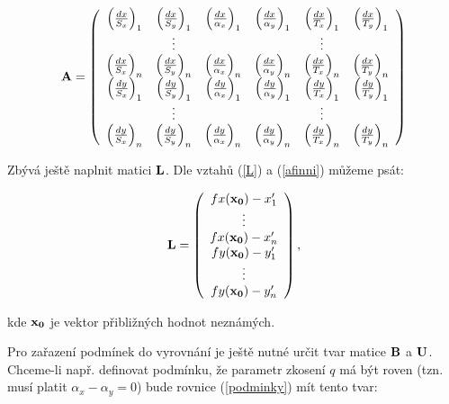\begin{eqnarray}\label{afine2A}
 {\bf A}= \left(
\begin{array}{cccccc}
 \left(\frac{dx}{S_x}\right)_1  &  \left(\frac{dx}{S_y}\right)_1 &
 \left(\frac{dx}{\alpha_{x}}\right)_1    & \left(\frac{dx}{\alpha_{y}}\right)_1 &  
 \left(\frac{dx}{T_x}\right)_1  &  \left(\frac{dx}{T_y}\right)_1 \\
 &\vdots& & &\vdots& \\ 
  \left(\frac{dx}{S_x}\right)_n &  \left(\frac{dx}{S_y}\right)_n &
 \left(\frac{dx}{\alpha_{x}}\right)_n    & \left(\frac{dx}{\alpha_{y}}\right)_n &  
 \left(\frac{dx}{T_x}\right)_n  &  \left(\frac{dx}{T_y}\right)_n \\ 
   \left(\frac{dy}{S_x}\right)_1 &  \left(\frac{dy}{S_y}\right)_1 &
 \left(\frac{dy}{\alpha_{x}}\right)_1    & \left(\frac{dy}{\alpha_{y}}\right)_1 &  
 \left(\frac{dy}{T_x}\right)_1  &  \left(\frac{dy}{T_y}\right)_1 \\
  &\vdots& & &\vdots& \\
  \left(\frac{dy}{S_x}\right)_n &  \left(\frac{dy}{S_y}\right)_n &
 \left(\frac{dy}{\alpha_{x}}\right)_n    & \left(\frac{dy}{\alpha_{y}}\right)_n &  
 \left(\frac{dy}{T_x}\right)_n  &  \left(\frac{dy}{T_y}\right)_n 
\end{array}
\right) 
\end{eqnarray}

Zbývá ještě naplnit matici ${\bf L}$. Dle vztahů (\ref{L}) a (\ref{afinni}) můžeme psát:

\begin{eqnarray} 
\label{affine2L}
{\bf L}= \left(
\begin{array}{c}
   fx({\bf x_0}) - x'_1  \\    
     \vdots  \\ 
   fx({\bf x_0}) - x'_n  \\
   fy({\bf x_0}) - y'_1 \\
      \vdots  \\ 
   fy({\bf x_0}) - y'_n\\
\end{array}
\right),
\end{eqnarray}

kde ${\bf x_0}$ je vektor přibližných hodnot neznámých.

Pro zařazení podmínek do vyrovnání je ještě nutné určit tvar matice $\bf B$ a  $\bf U$.
Chceme-li např. definovat podmínku, že parametr zkosení $q$ má být roven
(tzn. musí platit $\alpha_{x} - \alpha_{y} = 0 $) bude rovnice
(\ref{podminky}) mít tento tvar:

